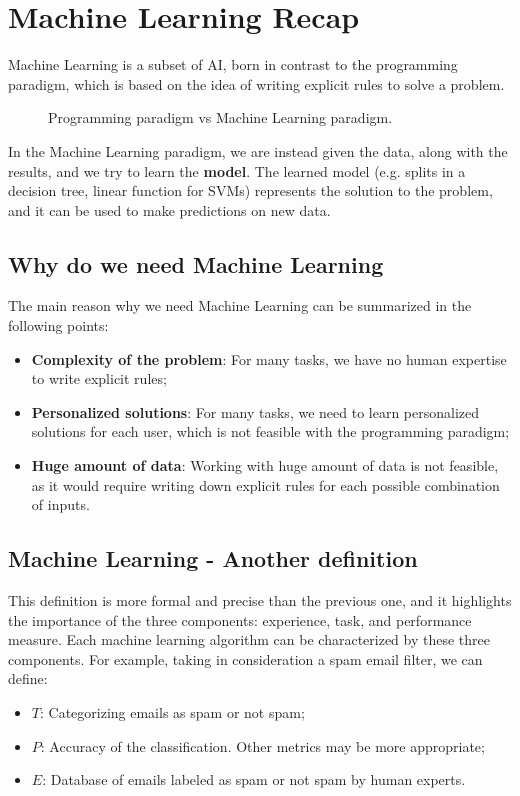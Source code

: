 \section{Machine Learning Recap}
Machine Learning is a subset of AI, born in contrast to the programming paradigm, which is based on the idea of writing explicit rules to solve a problem.
\begin{figure}[H]
    \centering
    \scalebox{0.8}{
        
    }
    \caption{Programming paradigm vs Machine Learning paradigm.}
    \label{fig:programming_paradigm}
\end{figure}
In the Machine Learning paradigm, we are instead given the data, along with the results, and we try to learn the \textbf{model}. The learned model
(e.g. splits in a decision tree, linear function for SVMs) represents the solution to the problem, and it can be used to make predictions on new data.

\subsection{Why do we need Machine Learning}
The main reason why we need Machine Learning can be summarized in the following points:
\begin{itemize}
    \item \textbf{Complexity of the problem}: For many tasks, we have no human expertise to write explicit rules;
    \item \textbf{Personalized solutions}: For many tasks, we need to learn personalized solutions for each user, which is not feasible with the programming paradigm;
    \item \textbf{Huge amount of data}: Working with huge amount of data is not feasible, as it would require writing down explicit rules for each possible combination of inputs.
\end{itemize}

\subsection{Machine Learning - Another definition}
This definition is more formal and precise than the previous one, and it highlights the importance of the three components: experience, task, and performance measure.
Each machine learning algorithm can be characterized by these three components. For example, taking in consideration a spam email filter, we can define:
\begin{itemize}
    \item $T$: Categorizing emails as spam or not spam;
    \item $P$: Accuracy of the classification. Other metrics may be more appropriate;
    \item $E$: Database of emails labeled as spam or not spam by human experts.
\end{itemize}

